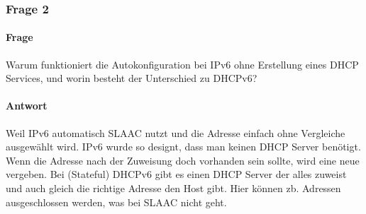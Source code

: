 \subsubsection{Frage 2}
\paragraph{Frage}
Warum funktioniert die Autokonfiguration bei IPv6 ohne Erstellung eines
DHCP Services, und worin besteht der Unterschied zu DHCPv6?
\paragraph{Antwort}
Weil IPv6 automatisch SLAAC nutzt und die Adresse einfach ohne Vergleiche ausgewählt wird. IPv6 wurde so designt, dass man keinen DHCP Server benötigt. Wenn die Adresse nach der Zuweisung doch vorhanden sein sollte, wird eine neue vergeben.
Bei (Stateful) DHCPv6 gibt es einen DHCP Server der alles zuweist und auch gleich die richtige Adresse den Host gibt. Hier können zb. Adressen ausgeschlossen werden, was bei SLAAC nicht geht.